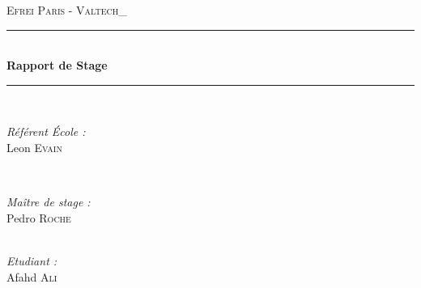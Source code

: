 \begin{titlepage}
\newcommand{\HRule}{\rule{\linewidth}{0.7mm}} %

\center %
 

\textsc{\LARGE Efrei Paris - Valtech_}\\[1.5cm] %


\HRule \\[0.4cm]
{ \huge \bfseries Rapport de Stage }\\[0.4cm] %
\HRule \\[1.5cm]
 

\begin{minipage}{0.4\textwidth}
\begin{flushleft} \large
\emph{Référent \'Ecole :}\\
Leon \textsc{Evain} %
\end{flushleft}
\end{minipage}
~
\begin{minipage}{0.4\textwidth}
\begin{flushright} \large
\emph{Maître de stage :}\\
Pedro \textsc{Roche} %
\end{flushright}
\end{minipage}\\[4cm]

\Large \emph{Etudiant :}\\
Afahd \textsc{Ali}\\[3cm] %




\end{titlepage}
